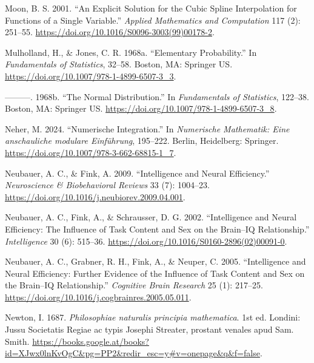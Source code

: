 \documentclass[
]{article}
\newlength{\cslhangindent}
\newlength{\cslentryspacingunit} %
\newenvironment{CSLReferences}[2] %
 {%
  \setlength{\parindent}{0pt}
  \ifodd #1
  \let\oldpar\par
  \def\par{\hangindent=\cslhangindent\oldpar}
  \fi
  \setlength{\parskip}{#2\cslentryspacingunit}
 }%
 {}
\begin{document}
\begin{CSLReferences}{1}{0}
\leavevmode{}%
Moon, B. S. 2001. {``An Explicit Solution for the Cubic Spline
Interpolation for Functions of a Single Variable.''} \emph{Applied
Mathematics and Computation} 117 (2): 251--55.
\url{https://doi.org/10.1016/S0096-3003(99)00178-2}.

\leavevmode{}%
Mulholland, H., \& Jones, C. R. 1968a. {``Elementary Probability.''} In
\emph{Fundamentals of Statistics}, 32--58. Boston, MA: Springer US.
\url{https://doi.org/10.1007/978-1-4899-6507-3_3}.

\leavevmode{}%
---------. 1968b. {``The Normal Distribution.''} In \emph{Fundamentals
of Statistics}, 122--38. Boston, MA: Springer US.
\url{https://doi.org/10.1007/978-1-4899-6507-3_8}.

\leavevmode{}%
Neher, M. 2024. {``Numerische Integration.''} In \emph{{Numerische
Mathematik: Eine anschauliche modulare Einführung}}, 195--222. Berlin,
Heidelberg: Springer. \url{https://doi.org/10.1007/978-3-662-68815-1_7}.

\leavevmode{}%
Neubauer, A. C., \& Fink, A. 2009. {``Intelligence and Neural
Efficiency.''} \emph{Neuroscience \& Biobehavioral Reviews} 33 (7):
1004--23. \url{https://doi.org/10.1016/j.neubiorev.2009.04.001}.

\leavevmode{}%
Neubauer, A. C., Fink, A., \& Schrausser, D. G. 2002. {``Intelligence
and Neural Efficiency: The Influence of Task Content and Sex on the
Brain--IQ Relationship.''} \emph{Intelligence} 30 (6): 515--36.
\url{https://doi.org/10.1016/S0160-2896(02)00091-0}.

\leavevmode{}%
Neubauer, A. C., Grabner, R. H., Fink, A., \& Neuper, C. 2005.
{``Intelligence and Neural Efficiency: Further Evidence of the Influence
of Task Content and Sex on the Brain--IQ Relationship.''}
\emph{Cognitive Brain Research} 25 (1): 217--25.
\url{https://doi.org/10.1016/j.cogbrainres.2005.05.011}.

\leavevmode{}%
Newton, I. 1687. \emph{{Philosophiae naturalis principia mathematica}}.
1st ed. Londini: {Jussu Societatis Regiae ac typis Josephi Streater,
prostant venales apud Sam. Smith}.
\url{https://books.google.at/books?id=XJwx0lnKvOgC\&pg=PP2\&redir_esc=y\#v=onepage\&q\&f=false}.


\end{CSLReferences}
\end{document}
